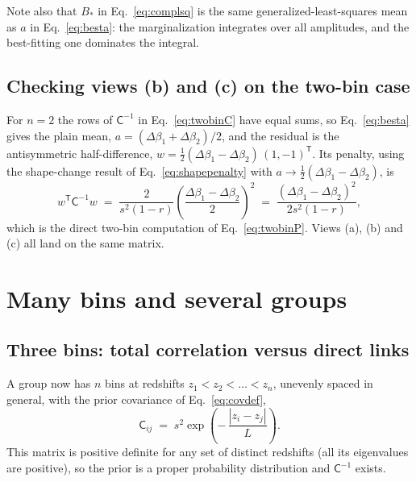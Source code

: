\documentclass[11pt]{article}
\newcommand{\Cov}{\mathsf{C}}
\newcommand{\T}{^{\mathsf{T}}}
\begin{document}
Note also that $B_*$ in Eq.~\eqref{eq:complsq} is the same
generalized-least-squares mean as $a$ in Eq.~\eqref{eq:besta}: the
marginalization integrates over all amplitudes, and the best-fitting
one dominates the integral.

\subsection{Checking views (b) and (c) on the two-bin case}
\label{sec:check2}

For $n = 2$ the rows of $\Cov^{-1}$ in Eq.~\eqref{eq:twobinC} have
equal sums, so Eq.~\eqref{eq:besta} gives the plain mean,
$a = (\Delta\beta_1 + \Delta\beta_2)/2$, and the residual is the
antisymmetric half-difference,
$w = \tfrac{1}{2}(\Delta\beta_1 - \Delta\beta_2)\,(1, -1)\T$.  Its
penalty, using the shape-change result of Eq.~\eqref{eq:shapepenalty}
with $a \to \tfrac{1}{2}(\Delta\beta_1 - \Delta\beta_2)$, is
\begin{equation}
  w\T \Cov^{-1} w
  \;=\;
  \frac{2}{s^2 (1-r)}
  \left(\frac{\Delta\beta_1 - \Delta\beta_2}{2}\right)^{\!2}
  \;=\;
  \frac{(\Delta\beta_1 - \Delta\beta_2)^2}{2 s^2 (1 - r)},
  \label{eq:check2}
\end{equation}
which is the direct two-bin computation of Eq.~\eqref{eq:twobinP}.
Views (a), (b) and (c) all land on the same matrix.

\section{Many bins and several groups}
\label{sec:general}

\subsection{Three bins: total correlation versus direct links}
\label{sec:kernel}

A group now has $n$ bins at redshifts $z_1 < z_2 < \dots < z_n$,
unevenly spaced in general, with the prior covariance of
Eq.~\eqref{eq:covdef},
\begin{equation}
  \Cov_{ij} \;=\; s^2 \exp\!\left(-\,\frac{|z_i - z_j|}{L}\right).
  \label{eq:nbinC}
\end{equation}
This matrix is positive definite for any set of distinct redshifts
(all its eigenvalues are positive), so the prior is a proper
probability distribution and $\Cov^{-1}$ exists.
\end{document}
